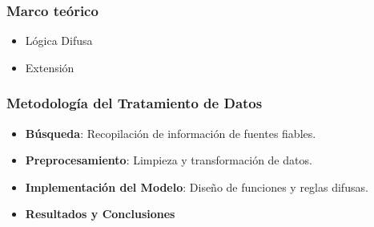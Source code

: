 \documentclass{beamer}
\newcommand{\slideauthor}[1]{\gdef\insertslideauthor{#1}}
\newcommand{\insertslideauthor}{}
\begin{document}
\begin{frame}
\frametitle{Marco teórico}
\slideauthor{Diego Fogued}
\begin{itemize}
    \item Lógica Difusa
    \item Extensión
\end{itemize}

\end{frame}
\begin{frame}
\frametitle{Metodología del Tratamiento de Datos}
\slideauthor{Diego Fogued}
\begin{itemize}
    \item \textbf{Búsqueda}: Recopilación de información de fuentes fiables.
    \vspace{0.35cm} 
    \item \textbf{Preprocesamiento}: Limpieza y transformación de datos.
    \vspace{0.35cm} 
    \item \textbf{Implementación del Modelo}: Diseño de funciones y reglas difusas.
    \vspace{0.35cm} 
    \item \textbf{Resultados y Conclusiones}
\end{itemize}
\end{frame}
\end{document}
